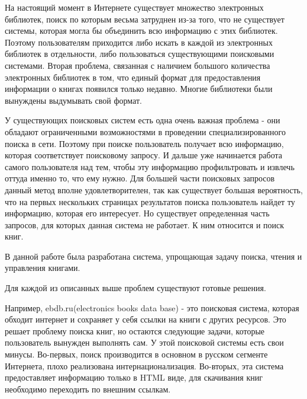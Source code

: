 \documentclass[a4paper]{report}
\begin{document}
На настоящий момент в Интернете существует множество электронных библиотек, поиск по которым весьма затруднен из-за того, что не существует системы, которая могла бы объединить всю информацию с этих библиотек. Поэтому пользователям приходится либо искать в каждой из электронных библиотек в отдельности, либо пользоваться существующими поисковыми системами. Вторая проблема, связанная с наличием большого количества электронных библиотек в том, что единый формат для предоставления информации о книгах появился только недавно. Многие библиотеки были вынуждены выдумывать свой формат. 

У существующих поисковых систем есть одна очень важная проблема - они обладают ограниченными возможностями в проведении специализированного поиска в сети. Поэтому при поиске пользователь получает всю информацию, которая соответствует поисковому запросу. И дальше уже начинается работа самого пользователя над тем, чтобы эту информацию профильтровать и извлечь оттуда именно то, что ему нужно. Для большей части поисковых запросов данный метод вполне удовлетворителен, так как существует большая вероятность, что на первых нескольких страницах результатов поиска пользователь найдет ту информацию, которая его интересует. Но существует определенная часть запросов, для которых данная система не работает. К ним относится и поиск книг.


В данной работе была разработана система, упрощающая задачу поиска, чтения и управления книгами. 



Для каждой из описанных выше проблем существуют готовые решения. 


Например, ebdb.ru(electronics books data base)  - это поисковая система, которая обходит интернет и сохраняет у себя ссылки на книги с других ресурсов. Это решает проблему поиска книг, но остаются следующие задачи, которые пользователь вынужден выполнять сам. У этой поисковой системы есть свои минусы. Во-первых, поиск производится в основном в русском сегменте Интернета, плохо реализована интернационализация. Во-вторых, эта система предоставляет информацию только в HTML виде, для скачивания книг необходимо переходить по внешним ссылкам.%
\end{document}
